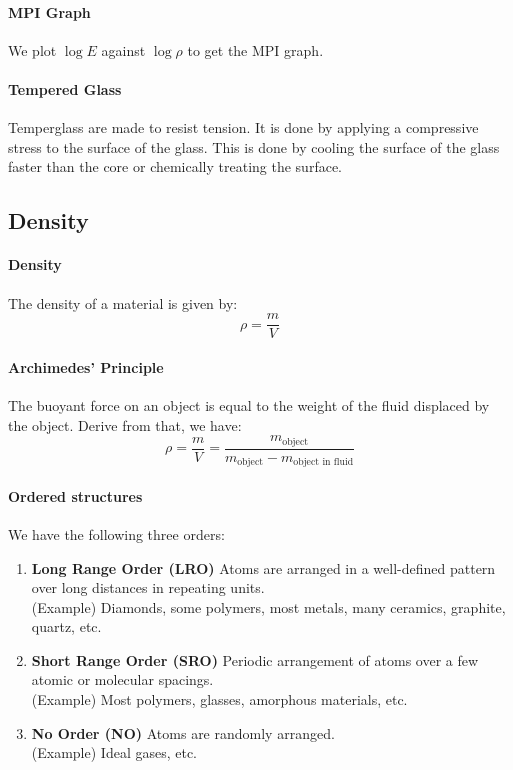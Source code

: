 \documentclass[11pt]{article}
\begin{document}
\paragraph{MPI Graph} We plot $\log E$ against $\log \rho$ to get the MPI graph. 
\paragraph{Tempered Glass} Temperglass are made to resist tension. It is done by applying a compressive stress to the surface of the glass. This is done by cooling the surface of the glass faster than the core or chemically treating the surface.
\subsection{Density}
\paragraph{Density} The density of a material is given by:
\begin{equation}
    \rho = \frac{m}{V}
\end{equation}
\paragraph{Archimedes' Principle} The buoyant force on an object is equal to the weight of the fluid displaced by the object. Derive from that, we have:
\begin{equation}
    \rho = \frac{m}{V} = \frac{m_{\text{object}}}{m_{\text{object}} - m_{\text{object in fluid}}}
\end{equation}
\paragraph{Ordered structures} We have the following three orders:
\begin{enumerate}
    \item \textbf{Long Range Order (LRO)} Atoms are arranged in a well-defined pattern over long distances in repeating units. \\
    (Example) Diamonds, some polymers, most metals, many ceramics, graphite, quartz, etc.
    \item \textbf{Short Range Order (SRO)} Periodic arrangement of atoms over a few atomic or molecular spacings. \\
    (Example) Most polymers, glasses, amorphous materials, etc.
    \item \textbf{No Order (NO)} Atoms are randomly arranged. \\
    (Example) Ideal gases, etc.
\end{enumerate}
\end{document}
